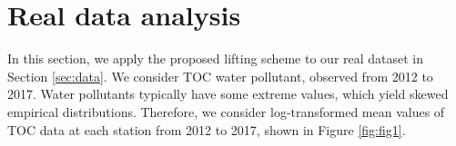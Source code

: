 \documentclass[11pt,titlepage]{article}
\begin{document}
%
%

\section{Real data analysis}\label{sec:streamflowrealdata}

In this section, we apply the proposed lifting scheme to our real dataset in Section \ref{sec:data}. %
We consider TOC water pollutant, observed from 2012 to 2017. Water pollutants typically have some extreme values, which yield skewed empirical distributions. %
Therefore, we consider log-transformed mean values of TOC data at each station from 2012 to 2017, shown in Figure \ref{fig:fig1}.
\end{document}

